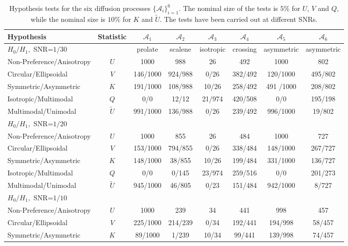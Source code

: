 \documentclass[dvips,aoas,preprint]{imsart}
\numberwithin{equation}{section}
\theoremstyle{plain}
\newcommand{\cA}{\mathcal{A}}
\newcommand{\wt}[1]{\widetilde{#1}}
\begin{document}
\begin{table}[!htbp]
  \caption{Hypothesis tests for the six diffusion processes
    $\{\cA_i\}_{i=1}^6$.  The nominal size of the tests is $5\%$ for
    $U$, $V$ and $Q$, while the nominal size is $10\%$ for $K$ and
    $\wt{U}$.  The tests have been carried out at different SNRs.}
    \begin{tabular}{lccccccc}
      \hline
      Hypothesis & Statistic & $\cA_1$ & $\cA_2$ & $\cA_3$ & $\cA_4$ & $\cA_5$ & $\cA_6$\\ 
\hline
$H_0/H_1,$ SNR=$1/30$ & & prolate & scalene & isotropic & crossing & asymmetric & asymmetric\\
\hline
      Non-Preference/Anisotropy & $U$ &  1000 & 988  & 26 & 492 & 1000 & 802\\ 
Circular/Ellipsoidal & $V$ & 146/1000 & 924/988 & 0/26 & 382/492 & 120/1000 & 495/802\\
      Symmetric/Asymmetric & $K$ & 191/1000 & 108/988 & 10/26 & 258/492 & 491 /1000&
      208/802 \\ 
      Isotropic/Multimodal& $Q$ & 0/0 & 12/12 & 21/974  & 420/508 & 0/0 & 195/198\\ 
      Multimodal/Unimodal & $\wt{U}$ & 991/1000 & 136/988 & 0/26 & 239/492 &  996/1000 & 19/802\\
      \hline
$H_0/H_1,$ SNR=$1/20$ & & & & & & & \\
\hline
      Non-Preference/Anisotropy & $U$ & 1000 & 855 & 26 & 484 & 1000 & 727\\ 
Circular/Ellipsoidal & $V$ & 153/1000 & 794/855 & 0/26 & 338/484 & 148/1000 & 267/727\\
      Symmetric/Asymmetric & $K$ & 148/1000 & 38/855 & 10/26 & 199/484 & 331/1000 & 136/727\\ 
      Isotropic/Multimodal& $Q$ & 0/0 & 0/145 & 23/974  &259/516& 0/0 & 201/273\\ 
      Multimodal/Unimodal & $\wt{U}$ & 945/1000 & 46/805 & 0/23   &   151/484 & 942/1000  & 8/727\\
      \hline
$H_0/H_1,$ SNR=$1/10$ & & & & & & & \\
\hline
     Non-Preference/Anisotropy & $U$ & 1000 & 239 & 34 & 441 & 998 & 457\\ 
Circular/Ellipsoidal & $V$ & 225/1000  & 214/239 & 0/34 & 192/441 & 194/998 & 58/457\\
     Symmetric/Asymmetric & $K$ & 89/1000   & 1/239 & 10/34 & 99/441 & 139/998 & 74/457\\ 

\end{tabular}
\end{table}
\end{document}
